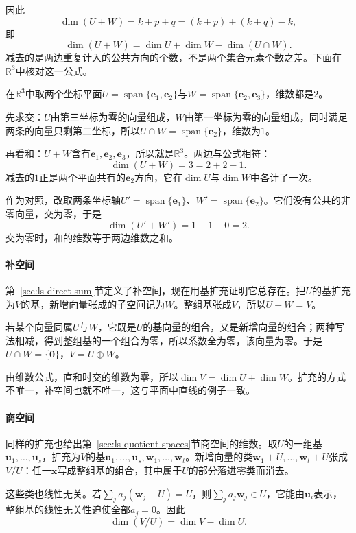 因此
\[
 \dim(U+W)=k+p+q=(k+p)+(k+q)-k,
\]
即
\begin{equation}
 \dim(U+W)=\dim U+\dim W-\dim(U\cap W).
 \label{eq:ls-dimension-formula}
\end{equation}
减去的是两边重复计入的公共方向的个数，不是两个集合元素个数之差。下面在$\mathbb R^3$中核对这一公式。
\begin{example}[两个坐标平面的和]
\label{ex:ls-dimension-formula-planes}
在$\mathbb R^3$中取两个坐标平面$U=\operatorname{span}\{\bm e_1,\bm e_2\}$与$W=\operatorname{span}\{\bm e_2,\bm e_3\}$，维数都是$2$。

先求交：$U$由第三坐标为零的向量组成，$W$由第一坐标为零的向量组成，同时满足两条的向量只剩第二坐标，所以$U\cap W=\operatorname{span}\{\bm e_2\}$，维数为$1$。

再看和：$U+W$含有$\bm e_1,\bm e_2,\bm e_3$，所以就是$\mathbb R^3$。两边与公式相符：
\[
 \dim(U+W)=3=2+2-1 .
\]
减去的$1$正是两个平面共有的$\bm e_2$方向，它在$\dim U$与$\dim W$中各计了一次。

作为对照，改取两条坐标轴$U'=\operatorname{span}\{\bm e_1\}$、$W'=\operatorname{span}\{\bm e_2\}$。它们没有公共的非零向量，交为零，于是
\[
 \dim(U'+W')=1+1-0=2 .
\]
交为零时，和的维数等于两边维数之和。
\end{example}

\paragraph{补空间}
第~\ref{sec:ls-direct-sum}节定义了补空间，现在用基扩充证明它总存在。把$U$的基扩充为$V$的基，新增向量张成的子空间记为$W$。整组基张成$V$，所以$U+W=V$。

若某个向量同属$U$与$W$，它既是$U$的基向量的组合，又是新增向量的组合；两种写法相减，得到整组基的一个组合为零，所以系数全为零，该向量为零。于是$U\cap W=\{\bm0\}$，$V=U\oplus W$。

由维数公式，直和时交的维数为零，所以$\dim V=\dim U+\dim W$。扩充的方式不唯一，补空间也就不唯一，这与平面中直线的例子一致。

\paragraph{商空间}
同样的扩充也给出第~\ref{sec:ls-quotient-spaces}节商空间的维数。取$U$的一组基$\bm u_1,\ldots,\bm u_s$，扩充为$V$的基$\bm u_1,\ldots,\bm u_s,\bm w_1,\ldots,\bm w_t$。新增向量的类$\bm w_1+U,\ldots,\bm w_t+U$张成$V/U$：任一$\bm x$写成整组基的组合，其中属于$U$的部分落进零类而消去。

这些类也线性无关。若$\sum_ja_j(\bm w_j+U)=U$，则$\sum_ja_j\bm w_j\in U$，它能由$\bm u_i$表示，整组基的线性无关性迫使全部$a_j=0$。因此
\begin{equation}
 \dim(V/U)=\dim V-\dim U.
 \label{eq:ls-quotient-dimension}
\end{equation}

